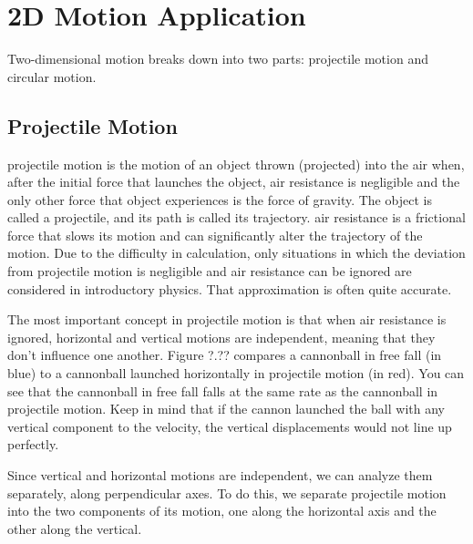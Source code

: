 \documentclass[main-physics.tex]{subfiles}
\begin{document}
\section{2D Motion Application}

Two-dimensional motion breaks down into two parts: projectile motion and circular motion.

\subsection{Projectile Motion} \label{tMF7JY}

\Gls{projectile motion} is the motion of an object thrown (projected) into the air when, after the initial force that launches the object, air resistance is negligible and the only other force that object experiences is the force of gravity. The object is called a \gls{projectile}, and its path is called its \gls{trajectory}. \Gls{air resistance} is a frictional force that slows its motion and can significantly alter the trajectory of the motion. Due to the difficulty in calculation, only situations in which the deviation from projectile motion is negligible and air resistance can be ignored are considered in introductory physics. That approximation is often quite accurate.

\vspace{1em}

The most important concept in projectile motion is that when air resistance is ignored, horizontal and vertical motions are independent, meaning that they don't influence one another. Figure ?.?? compares a cannonball in free fall (in blue) to a cannonball launched horizontally in projectile motion (in red). You can see that the cannonball in free fall falls at the same rate as the cannonball in projectile motion. Keep in mind that if the cannon launched the ball with any vertical component to the velocity, the vertical displacements would not line up perfectly.

\vspace{1em}

Since vertical and horizontal motions are independent, we can analyze them separately, along perpendicular axes. To do this, we separate projectile motion into the two components of its motion, one along the horizontal axis and the other along the vertical.
\end{document}

